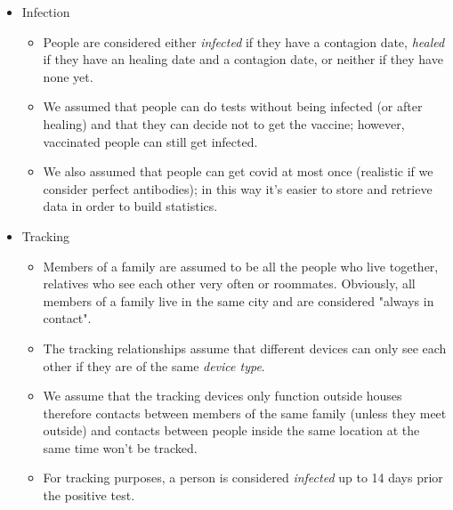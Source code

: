 \documentclass[12pt, a4paper]{article}
\begin{document}
\begin{itemize}

    \item Infection
    \begin{itemize}
        \item[] People are considered either \emph{infected} if they have a 
            contagion date, \emph{healed} if they have an healing date and a 
            contagion date, or neither if they have none yet.
        \item[] We assumed that people can do tests without being infected 
            (or after healing) and that they can decide not to get the vaccine;
            however, vaccinated people can still get infected.
        \item[] We also assumed that people can get covid at most once 
            (realistic if we consider perfect antibodies); in this way it's 
            easier to store and retrieve data in order to build statistics.
    \end{itemize}

    \item Tracking
    \begin{itemize}
        \item[] Members of a family are assumed to be all the people who live 
            together, relatives who see each other very often or roommates. 
            Obviously, all members of a family live in the same city and are 
            considered "always in contact".
        \item[] The tracking relationships assume that different devices can 
            only see each other if they are of the same \emph{device type}.
        \item[] We assume that the tracking devices only function outside 
            houses therefore contacts between members of the same family 
            (unless they meet outside) and contacts between people inside the
            same location at the same time won't be tracked.
        \item[] For tracking purposes, a person is considered \emph{infected}
            up to 14 days prior the positive test. 
    \end{itemize}

    \vfill  %


\end{itemize}
\end{document}
